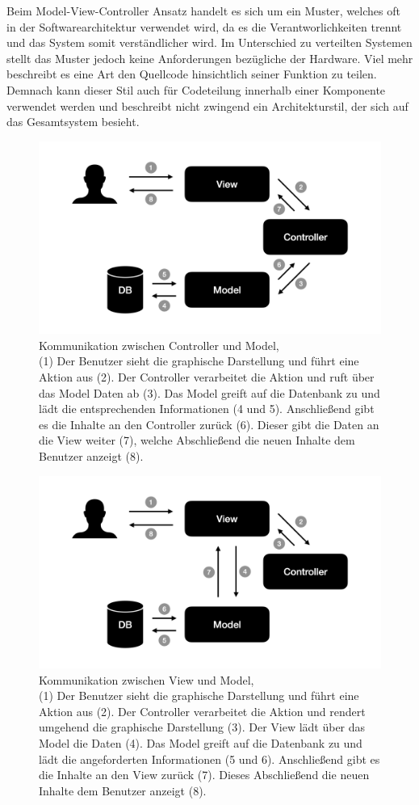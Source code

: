 Beim Model-View-Controller Ansatz handelt es sich um ein Muster, welches oft in der Softwarearchitektur verwendet wird, da es die Verantworlichkeiten trennt und das System somit verständlicher wird.
Im Unterschied zu verteilten Systemen stellt das Muster jedoch keine Anforderungen bezügliche der Hardware. Viel mehr beschreibt es eine Art den Quellcode hinsichtlich seiner Funktion zu teilen. Demnach kann dieser Stil auch für Codeteilung innerhalb einer Komponente verwendet werden und beschreibt nicht zwingend ein Architekturstil, der sich auf das Gesamtsystem besieht.

\begin{figure}
	\centering
	\includegraphics[width=.6\textwidth]{Assets/Interaktionsorientiert.001}
	\caption[Kommunikation zwischen Controller und Model]{Kommunikation zwischen Controller und Model, \\ (1) Der Benutzer sieht die graphische Darstellung und führt eine Aktion aus (2). Der Controller verarbeitet die Aktion und ruft über das Model Daten ab (3). Das Model greift auf die Datenbank zu und lädt die entsprechenden Informationen (4 und 5). Anschließend gibt es die Inhalte an den Controller zurück (6). Dieser gibt die Daten an die View weiter (7), welche Abschließend die neuen Inhalte dem Benutzer anzeigt (8).}
	\label{fig:mvc-cm-kommunikation}
 \end{figure}
 
 \begin{figure}
 	\centering
    \includegraphics[width=.6\textwidth]{Assets/Interaktionsorientiert.002}
	\caption[Kommunikation zwischen View und Model]{Kommunikation zwischen View und Model, \\ (1) Der Benutzer sieht die graphische Darstellung und führt eine Aktion aus (2). Der Controller verarbeitet die Aktion und rendert umgehend die graphische Darstellung (3). Der View lädt über das Model die Daten (4). Das Model greift auf die Datenbank zu und lädt die angeforderten Informationen (5 und 6). Anschließend gibt es die Inhalte an den View zurück (7). Dieses Abschließend die neuen Inhalte dem Benutzer anzeigt (8).}
    \label{fig:mvc-vm-kommunikation}
 \end{figure}

